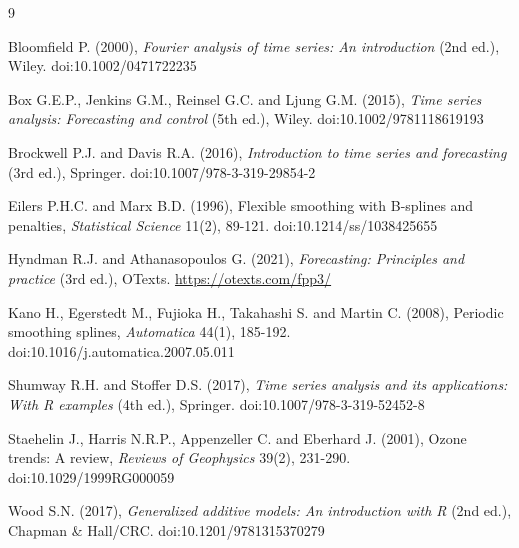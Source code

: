 \documentclass[10pt,twoside]{article}
\numberwithin{equation}{section}
\begin{document}

\begin{thebibliography}{9}


Bloomfield P. (2000), {\it Fourier analysis of time series: An introduction} (2nd ed.), Wiley. doi:10.1002/0471722235




Box G.E.P., Jenkins G.M., Reinsel G.C. and Ljung G.M. (2015), {\it Time series analysis: Forecasting and control} (5th ed.), Wiley. doi:10.1002/9781118619193




Brockwell P.J. and Davis R.A. (2016), {\it Introduction to time series and forecasting} (3rd ed.), Springer. doi:10.1007/978-3-319-29854-2




Eilers P.H.C. and Marx B.D. (1996), Flexible smoothing with B-splines and penalties, {\it Statistical Science} 11(2), 89-121. doi:10.1214/ss/1038425655




Hyndman R.J. and Athanasopoulos G. (2021), {\it Forecasting: Principles and practice} (3rd ed.), OTexts. \url{https://otexts.com/fpp3/}




Kano H., Egerstedt M., Fujioka H., Takahashi S. and Martin C. (2008), Periodic smoothing splines, {\it Automatica} 44(1), 185-192. doi:10.1016/j.automatica.2007.05.011




Shumway R.H. and Stoffer D.S. (2017), {\it Time series analysis and its applications: With R examples} (4th ed.), Springer. doi:10.1007/978-3-319-52452-8




Staehelin J., Harris N.R.P., Appenzeller C. and Eberhard J. (2001), Ozone trends: A review, {\it Reviews of Geophysics} 39(2), 231-290. doi:10.1029/1999RG000059




Wood S.N. (2017), {\it Generalized additive models: An introduction with R} (2nd ed.), Chapman \& Hall/CRC. doi:10.1201/9781315370279

\end{thebibliography}
\end{document}
